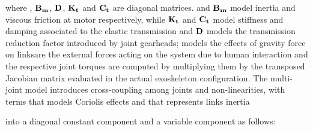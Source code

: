 where \DIFdelbegin {}\DIFdelend \DIFaddbegin {}\DIFaddend , $\mathbf{B_m}$, $\mathbf{D}$, $\mathbf{K_t}$ and $\mathbf{C_t}$ are diagonal matrices.  \DIFdelbegin {}\DIFdelend \DIFaddbegin {}\DIFaddend and $\mathbf{B_m}$ model inertia and viscous friction at motor respectively, while $\mathbf{K_t}$ and $\mathbf{C_t}$ model stiffness and damping associated to the elastic transmission and $\mathbf{D}$ models  the transmission reduction factor introduced by joint gearheads; \DIFdelbegin {}\DIFdelend \DIFaddbegin {}\DIFaddend models the effects of gravity force on links\DIFdelbegin {}\DIFdelend \DIFaddbegin {}\DIFaddend are the external  forces  acting on the system  due to human interaction  and the respective joint torques are computed by multiplying them by the transposed Jacobian matrix  \DIFdelbegin {}\DIFdelend \DIFaddbegin {}\DIFaddend evaluated in the actual exoskeleton configuration. The multi-joint model introduces cross-coupling among joints and non-linearities, with terms \DIFdelbegin {}\DIFdelend \DIFaddbegin {}\DIFaddend that models Coriolis effects and \DIFdelbegin {}\DIFdelend \DIFaddbegin {}\DIFaddend that represents links inertia \DIFdelbegin {}%

\DIFdelend \DIFaddbegin {}\DIFaddend into a diagonal constant component and a variable component as follows:
\DIFaddbegin 

